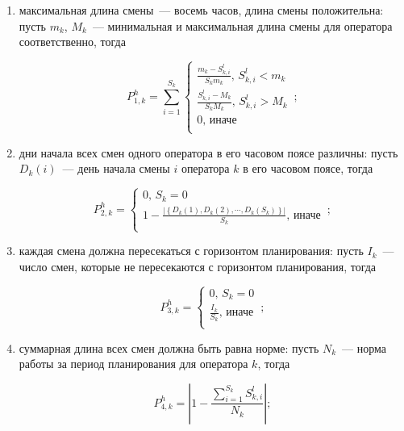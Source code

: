 \documentclass[times,specification,annotation]{itmo-student-thesis}
\begin{document}
\begin{enumerate}
    \item максимальная длина смены~--- восемь часов, длина смены положительна: пусть $m_k$, $M_k$~--- минимальная и максимальная длина смены для оператора соответственно, тогда
    
    \begin{equation} P^h_{1, k} = \sum\limits_{i = 1}^{S_k} \begin{cases} \frac{m_k - S^l_{k, i}}{S_k m_k},\, S^l_{k, i} < m_k \\ \frac{S^l_{k, i} - M_k}{S_k M_k},\, S^l_{k, i} > M_k \\ 0,\, \text{иначе} \\ \end{cases}\,; \end{equation}
    
    \item дни начала всех смен одного оператора в его часовом поясе различны: пусть $D_k(i)$~--- день начала смены $i$ оператора $k$ в его часовом поясе, тогда
    
    \begin{equation} P^h_{2, k} = \begin{cases} 0,\, S_k = 0 \\ 1 - \frac{\left| \left\{ D_k(1), D_k(2), \cdots, D_k(S_k) \right\} \right|}{S_k},\, \text{иначе} \\ \end{cases}\,; \end{equation}
    
    \item каждая смена должна пересекаться с горизонтом планирования: пусть $I_k$~--- число смен, которые не пересекаются с горизонтом планирования, тогда
    
    \begin{equation} P^h_{3, k} = \begin{cases} 0,\, S_k = 0 \\ \frac{I_k}{S_k},\, \text{иначе} \\ \end{cases}\,; \end{equation}

    \item суммарная длина всех смен должна быть равна норме: пусть $N_k$~--- норма работы за период планирования для оператора $k$, тогда

    \begin{equation} P^h_{4, k} = \left| 1 - \frac{\sum\limits_{i = 1}^{S_k}{S^l_{k, i}}}{N_k} \right|; \end{equation}


\end{enumerate}
\end{document}
